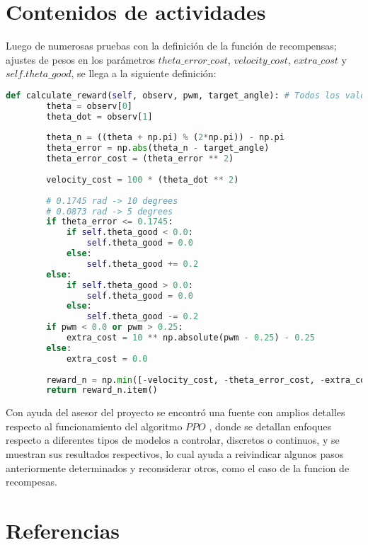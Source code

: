 \documentclass[12pt]{article}
\begin{document}
\newpage

\section*{Contenidos de actividades}


Luego de numerosas pruebas con la definición de la función de recompensas; ajustes de pesos en los parámetros $theta\_error\_cost$, $velocity\_cost$, $extra\_cost$ y $self.theta\_good$, se llega a la siguiente definición:

\begin{lstlisting}[language=Python, caption=Función de recompensas utilizada]
    def calculate_reward(self, observ, pwm, target_angle): # Todos los valores estan en radianes
        theta = observ[0]
        theta_dot = observ[1]
        
        theta_n = ((theta + np.pi) % (2*np.pi)) - np.pi
        theta_error = np.abs(theta_n - target_angle)
        theta_error_cost = (theta_error ** 2)
        
        velocity_cost = 100 * (theta_dot ** 2)
        
        # 0.1745 rad -> 10 degrees
        # 0.0873 rad -> 5 degrees
        if theta_error <= 0.1745:
            if self.theta_good < 0.0:
                self.theta_good = 0.0
            else:
                self.theta_good += 0.2
        else:
            if self.theta_good > 0.0:
                self.theta_good = 0.0
            else:
                self.theta_good -= 0.2
        if pwm < 0.0 or pwm > 0.25:
            extra_cost = 10 ** np.absolute(pwm - 0.25) - 0.25
        else:
            extra_cost = 0.0
        
        reward_n = np.min([-velocity_cost, -theta_error_cost, -extra_cost]) + self.theta_good
        return reward_n.item()
\end{lstlisting}

Con ayuda del asesor del proyecto se encontró una fuente con amplios detalles respecto al funcionamiento del algoritmo $PPO$ \cite{37PPO}, donde se detallan enfoques respecto a diferentes tipos de modelos a controlar, discretos o continuos, y se muestran sus resultados respectivos, lo cual ayuda a reivindicar algunos pasos anteriormente determinados y reconsiderar otros, como el caso de la funcion de recompesas.

\newpage

\section*{Referencias}
\renewcommand\refname{}


\end{document}
